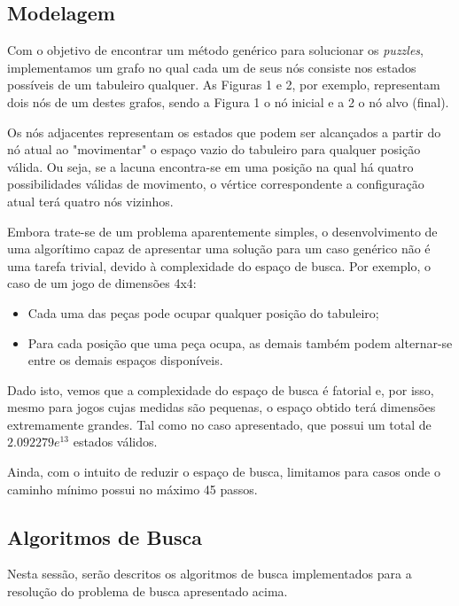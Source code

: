 \documentclass[12pt,a4paper]{article}
\begin{document}
\subsection{Modelagem}
    \par Com o objetivo de encontrar um método genérico para solucionar os \textit{puzzles}, implementamos um grafo no qual cada um de seus nós consiste nos estados possíveis de um tabuleiro qualquer. As Figuras 1 e 2, por exemplo, representam dois nós de um destes grafos, sendo a Figura 1 o nó inicial e a 2 o nó alvo (final).
    \par Os nós adjacentes representam os estados que podem ser alcançados a partir do nó atual ao "movimentar" o espaço vazio do tabuleiro para qualquer posição válida. Ou seja, se a lacuna encontra-se em uma posição na qual há quatro possibilidades válidas de movimento, o vértice correspondente a configuração atual terá quatro nós vizinhos.
    \par Embora trate-se de um problema aparentemente simples, o desenvolvimento de uma algorítimo capaz de apresentar uma solução para um caso genérico não é uma tarefa trivial, devido à complexidade do espaço de busca. Por exemplo, o caso de um jogo de dimensões 4x4:
    \begin{itemize}
    \item Cada uma das peças pode ocupar qualquer posição do tabuleiro;
    \item Para cada posição que uma peça ocupa, as demais também podem alternar-se entre os demais espaços disponíveis.
    \end{itemize}
    \par Dado isto, vemos que a complexidade do espaço de busca é fatorial e, por isso, mesmo para jogos cujas medidas são pequenas, o espaço obtido terá dimensões extremamente grandes. Tal como no caso apresentado, que possui um total de $2.092279 e^{1   3}$ estados válidos.  \par
    Ainda, com o intuito de reduzir o espaço de busca, limitamos para casos onde o caminho mínimo possui no máximo 45 passos. 

\subsection{Algoritmos de Busca}
Nesta sessão, serão descritos os algoritmos de busca implementados para a resolução do problema de busca apresentado acima. 

\end{document}
